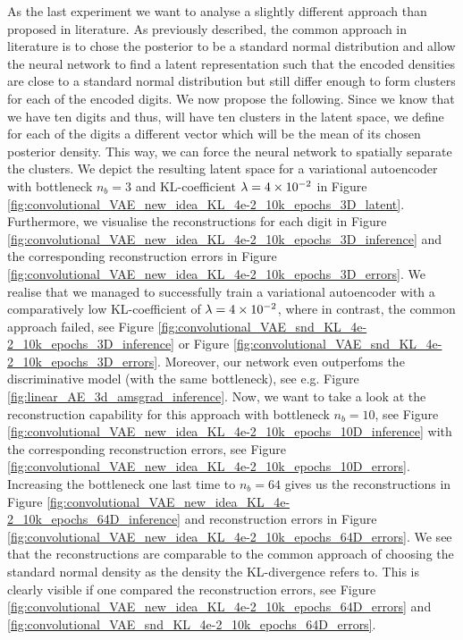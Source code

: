 As the last experiment we want to analyse a slightly different approach than proposed in literature. As previously described, the common approach in literature is to chose the posterior to be a standard normal distribution and allow the neural network to find a latent representation such that the encoded densities are close to a standard normal distribution but still differ enough to form clusters for each of the encoded digits. We now propose the following. Since we know that we have ten digits and thus, will have ten clusters in the latent space, we define for each of the digits a different vector which will be the mean of its chosen posterior density. This way, we can force the neural network to spatially separate the clusters. We depict the resulting latent space for a variational autoencoder with bottleneck $n_b=3$ and KL-coefficient $\lambda=\num{4e-2}$ in Figure \ref{fig:convolutional_VAE_new_idea_KL_4e-2_10k_epochs_3D_latent}. Furthermore, we visualise the reconstructions for each digit in Figure \ref{fig:convolutional_VAE_new_idea_KL_4e-2_10k_epochs_3D_inference} and the corresponding reconstruction errors in Figure \ref{fig:convolutional_VAE_new_idea_KL_4e-2_10k_epochs_3D_errors}.
We realise that we managed to successfully train a variational autoencoder with a comparatively low KL-coefficient of $\lambda=\num{4e-2}$, where in contrast, the common approach failed, see Figure \ref{fig:convolutional_VAE_snd_KL_4e-2_10k_epochs_3D_inference} or Figure \ref{fig:convolutional_VAE_snd_KL_4e-2_10k_epochs_3D_errors}. Moreover, our network even outperfoms the discriminative model (with the same bottleneck), see e.g. Figure \ref{fig:linear_AE_3d_amsgrad_inference}. Now, we want to take a look at the reconstruction capability for this approach with bottleneck $n_b=10$, see Figure \ref{fig:convolutional_VAE_new_idea_KL_4e-2_10k_epochs_10D_inference} with the corresponding reconstruction errors, see Figure \ref{fig:convolutional_VAE_new_idea_KL_4e-2_10k_epochs_10D_errors}. Increasing the bottleneck one last time to $n_b=64$ gives us the reconstructions in Figure \ref{fig:convolutional_VAE_new_idea_KL_4e-2_10k_epochs_64D_inference} and reconstruction errors in Figure \ref{fig:convolutional_VAE_new_idea_KL_4e-2_10k_epochs_64D_errors}. We see that the reconstructions are comparable to the common approach of choosing the standard normal density as the density the KL-divergence refers to. This is clearly visible if one compared the reconstruction errors, see Figure \ref{fig:convolutional_VAE_new_idea_KL_4e-2_10k_epochs_64D_errors} and \ref{fig:convolutional_VAE_snd_KL_4e-2_10k_epochs_64D_errors}.
